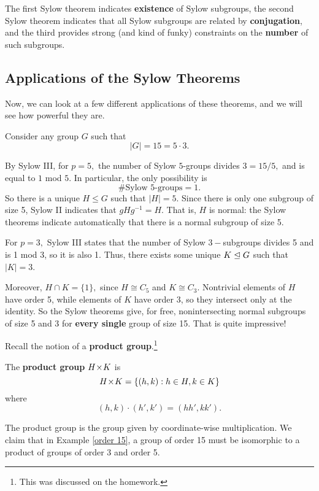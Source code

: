 The first Sylow theorem indicates \textbf{existence} of Sylow subgroups, the second Sylow theorem indicates that all Sylow subgroups are related by \textbf{conjugation}, and the third provides strong (and kind of funky) constraints on the \textbf{number} of such subgroups.



\subsection{Applications of the Sylow Theorems}

Now, we can look at a few different applications of these theorems, and we will see how powerful they are.

\begin{example}\label{order 15}
Consider any group $G$ such that \[|G| = 15 = 5 \cdot 3.\] 

By Sylow III, for $p = 5,$ the number of Sylow $5$-groups divides $3 = 15/5,$ and is equal to $1$ mod $5.$ In particular, the only possibility is \[\# \text{Sylow 5-groups} = 1.\] So there is a unique $H \leq G$ such that $|H| = 5.$ Since there is only one subgroup of size 5, Sylow II indicates that $gHg^{-1} = H.$ That is, $H$ is normal: the Sylow theorems indicate automatically that there is a normal subgroup of size 5.

For $p = 3,$ Sylow III states that the number of Sylow $3-$subgroups divides 5 and is 1 mod 3, so it is also 1. Thus, there exists some unique $K \trianglelefteq G$ such that $|K| = 3$.
\end{example}

Moreover, $H \cap K = \{1\},$ since $H \cong C_5$ and $K \cong C_3.$ Nontrivial elements of $H$ have order 5, while elements of $K$ have order 3, so they intersect only at the identity. So the Sylow theorems give, for free, nonintersecting normal subgroups of size 5 and 3 for \textbf{every single} group of size 15. That is quite impressive! 

Recall the notion of a \textbf{product group}.\footnote{This was discussed on the homework.}

\begin{definition}
The \textbf{product group} $H \hspace{0.05em}{\times}\hspace{0.05em} K$ is 
\[
H \hspace{0.05em}{\times}\hspace{0.05em} K = \{(h, k) : h \in H, k \in K\}
\]
where 
\[
(h, k) \cdot (h', k') = (hh', kk').
\]
\end{definition}

The product group is the group given by coordinate-wise multiplication. We claim that in Example \ref{order 15}, a group of order 15 must be isomorphic to a product of groups of order 3 and order 5.


